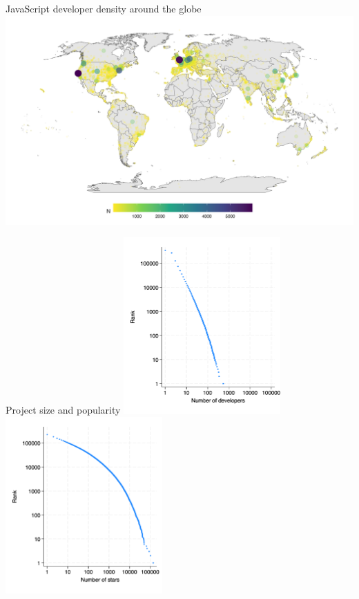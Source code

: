 \documentclass[
  ignorenonframetext,
  aspectratio=169,
]{beamer}
\begin{document}
\begin{frame}{JavaScript developer density around the globe}
\protect\hypertarget{javascript-developer-density-around-the-globe}{}
\includegraphics{figures/map_developers.png}
\end{frame}

\begin{frame}{Project size and popularity}
\protect\hypertarget{project-size-and-popularity}{}
\includegraphics[width=0.45\textwidth,height=\textheight]{figures/developers_rank.png}
\includegraphics[width=0.45\textwidth,height=\textheight]{figures/stars_rank.png}
\end{frame}
\end{document}
